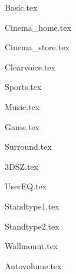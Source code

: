 {Basic.tex}

{Cinema_home.tex}

{Cinema_store.tex}

{Clearvoice.tex}

{Sports.tex}

{Music.tex}

{Game.tex}

{Surround.tex}

{3DSZ.tex}

{UserEQ.tex}


{Standtype1.tex}

{Standtype2.tex}

{Wallmount.tex}


{Autovolume.tex}
